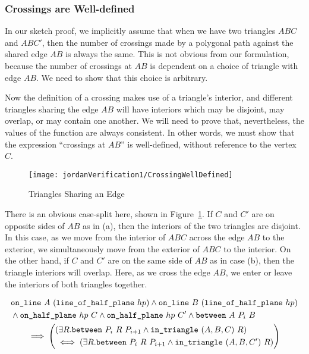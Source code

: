 \subsubsection{Crossings are Well-defined}\label{sec:CrossingsWellDefined}
In our sketch proof, we implicitly assume that when we have two triangles $ABC$ and $ABC'$, then the number of crossings made by a polygonal path against the shared edge $AB$ is always the same. This is not obvious from our formulation, because the number of crossings at $AB$ is dependent on a choice of triangle with edge $AB$. We need to show that this choice is arbitrary.

Now the definition of a crossing makes use of a triangle's interior, and different triangles sharing the edge $AB$ will have interiors which may be disjoint, may overlap, or may contain one another. We will need to prove that, nevertheless, the values of the function  are always consistent. In other words, we must show that the expression ``crossings at $AB$'' is well-defined, without reference to the vertex $C$.

\begin{figure}
\centering\texttt{[image: jordanVerification1/CrossingWellDefined]}
\caption{Triangles Sharing an Edge}
\label{fig:CrossingWellDefined}
\end{figure}

There is an obvious case-split here, shown in Figure~\ref{fig:CrossingWellDefined}. If $C$ and $C'$ are on opposite sides of $AB$ as in (a), then the interiors of the two triangles are disjoint. In this case, as we move from the interior of $ABC$ across the edge $AB$ to the exterior, we simultaneously move from the exterior of $ABC$ to the interior. On the other hand, if $C$ and $C'$ are on the same side of $AB$ as in case (b), then the triangle interiors will overlap. Here, as we cross the edge $AB$, we enter or leave the interiors of both triangles together. 

\begin{multline}\label{eq:crossChangeLemma1}
  \begin{split}
    &\texttt{on\_line}\ A\ (\texttt{line\_of\_half\_plane}\ hp) \wedge \texttt{on\_line}\ B\ (\texttt{line\_of\_half\_plane}\ hp)\\
    &\wedge\texttt{on\_half\_plane}\ hp\ C \wedge \texttt{on\_half\_plane}\ hp\ C'\wedge\texttt{between}\ A\ P_i\ B
  \end{split}\\
  \implies\left(\begin{split} 
      &(\exists R. \texttt{between}\ P_i\ R\ P_{i+1} \wedge \texttt{in\_triangle}\ (A,B,C)\ R)\\
      & \iff (\exists R. \texttt{between}\ P_i\ R\ P_{i+1} \wedge \texttt{in\_triangle}\ (A,B,C')\ R)
  \end{split}\right)
\end{multline}

